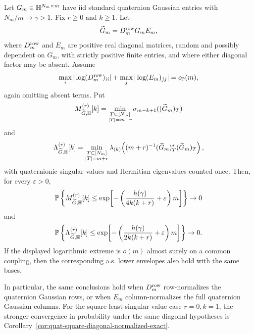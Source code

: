\begin{corollary}\label{cor:quat-diagonal-normalized-fixed-excess-fixed-k}
Let \(G_m\in\mathbb{H}^{N_m\times m}\) have iid standard quaternion Gaussian entries
with \(N_m/m\to\gamma>1\).  Fix \(r\ge0\) and \(k\ge1\).  Let
\[
  \widetilde G_m=D_m^{\rm row}G_mE_m,
\]
where \(D_m^{\rm row}\) and \(E_m\) are positive real diagonal matrices, random
and possibly dependent on \(G_m\), with strictly positive finite entries, and
where either diagonal factor may be absent.  Assume
\[
  \max_i|\log(D_m^{\rm row})_{ii}|
  +
  \max_j|\log(E_m)_{jj}|
  =o_{\mathbb{P}}(m),
\]
again omitting absent terms.  Put
\[
  M_{\widetilde G,\mathbb{H}}^{(r)}[k]
  =
  \min_{\substack{T\subset[N_m]\\ |T|=m+r}}
  \sigma_{m-k+1}((\widetilde G_m)_T)
\]
and
\[
  \Lambda_{\widetilde G,\mathbb{H}}^{(r)}[k]
  =
  \min_{\substack{T\subset[N_m]\\ |T|=m+r}}
  \lambda_{(k)}\!\left((m+r)^{-1}(\widetilde G_m)_T^*
  (\widetilde G_m)_T\right),
\]
with quaternionic singular values and Hermitian eigenvalues counted once.  Then,
for every \(\varepsilon>0\),
\[
  \mathbb{P}\left\{M_{\widetilde G,\mathbb{H}}^{(r)}[k]\le
  \exp\!\left[-\left(\frac{h(\gamma)}{4k(k+r)}
    +\varepsilon\right)m\right]\right\}
  \to0
\]
and
\[
  \mathbb{P}\left\{\Lambda_{\widetilde G,\mathbb{H}}^{(r)}[k]\le
  \exp\!\left[-\left(\frac{h(\gamma)}{2k(k+r)}
    +\varepsilon\right)m\right]\right\}
  \to0.
\]
If the displayed logarithmic extreme is \(o(m)\) almost surely on a common
coupling, then the corresponding a.s. lower envelopes also hold with the same
bases.

In particular, the same conclusions hold when \(D_m^{\rm row}\) row-normalizes
the quaternion Gaussian rows, or when \(E_m\) column-normalizes the full
quaternion Gaussian columns.
For the square least-singular-value case \(r=0,k=1\), the stronger convergence
in probability under the same diagonal hypotheses is
Corollary~\ref{cor:quat-square-diagonal-normalized-exact}.
\end{corollary}

